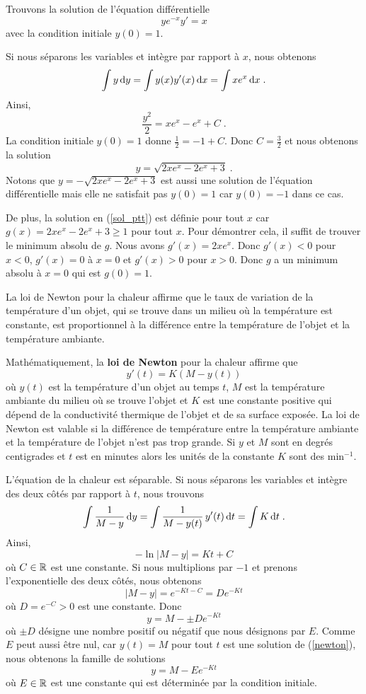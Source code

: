 {\begin{egg}
Trouvons la solution de l'équation différentielle
\[
y e^{-x} y'= x
\]
avec la condition initiale $y(0) = 1$.

Si nous séparons les variables et intègre par rapport à $x$, nous obtenons
\[
\int y \,\mathrm{d}y = \int y(x) y'(x) \,\mathrm{d}x = \int x e^x \,\mathrm{d}x \; .
\]
Ainsi,
\[
\frac{y^2}{2} = x e^x - e^x + C \; .
\]
La condition initiale $y(0)=1$ donne
$\displaystyle \frac{1}{2} = -1 + C$.  Donc
$\displaystyle C = \frac{3}{2}$ et nous obtenons la solution
\begin{equation} \label{sol_ptt}
y = \sqrt{2x e^x - 2 e^x + 3} \; .
\end{equation}
Notons que $y = -\sqrt{2x e^x - 2 e^x + 3}$ est aussi une solution de
l'équation différentielle mais elle ne satisfait pas $y(0)=1$ car
$y(0)=-1$ dans ce cas.

De plus, la solution en (\ref{sol_ptt}) est définie pour tout $x$ car
$g(x) = 2x e^x - 2 e^x + 3 \geq 1$ pour tout $x$.  Pour démontrer
cela, il suffit de trouver le minimum absolu de $g$.  Nous avons
$g'(x) = 2 x e^x$.  Donc $g'(x) < 0 $ pour $x<0$, $g'(x) = 0$ à $x=0$
et $g'(x)>0$ pour $x>0$.  Donc $g$ a un minimum absolu à $x=0$ qui est
$g(0)=1$.
\end{egg}

\begin{egg}
La loi de Newton pour la chaleur affirme que le taux de variation de
la température d'un objet, qui se trouve dans un milieu où la
température est constante, est proportionnel à la différence entre la
température de l'objet et la température ambiante.

Mathématiquement, la {\bfseries loi de Newton} pour la chaleur affirme
que
\begin{equation}\label{newton}
y'(t) = K ( M - y(t) )
\end{equation}
où $y(t)$ est la température d'un objet au temps $t$, $M$ est la
température ambiante du milieu où se trouve l'objet et $K$
est une constante positive qui dépend de la conductivité thermique de
l'objet et de sa surface exposée.  La loi de Newton est valable si la
différence de température entre la température ambiante et la
température de l'objet n'est pas trop grande. Si $y$ et $M$ sont en
degrés centigrades et $t$ est en minutes alors les unités de la
constante $K$ sont des min$^{-1}$.

L'équation de la chaleur est séparable.  Si nous séparons les variables et
intègre des deux côtés par rapport à $t$, nous trouvons
\[
\int \frac{1}{M-y} \,\mathrm{d}y = \int \frac{1}{M-y(t)} \, y'(t) \,\mathrm{d}t
= \int K \,\mathrm{d}t \; .
\]
Ainsi,
\[
-\ln|M-y| = Kt + C
\]
où $C \in \mathbb{R}$ est une constante.  Si nous multiplions par $-1$ et
prenons l'exponentielle des deux côtés, nous obtenons
\[
|M-y| = e^{-Kt-C} = D e^{-Kt}
\]
où $D=e^{-C}>0$ est une constante.  Donc
\[
y = M - \pm D e^{-Kt}
\]
où $\pm D$ désigne une nombre positif ou négatif que nous désignons par
$E$.  Comme $E$ peut aussi être nul, car $y(t) = M$ pour tout $t$ est
une solution de (\ref{newton}), nous obtenons la famille de
solutions
\[
y = M - E e^{-Kt}
\]
où $E\in \mathbb{R}$ est une constante qui est déterminée par la condition
initiale.


\end{egg}}
